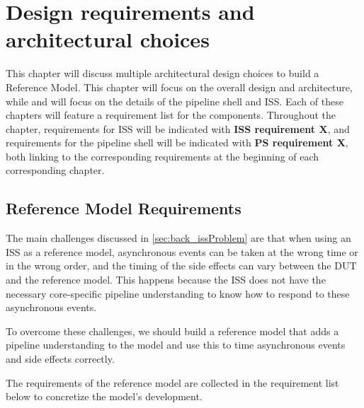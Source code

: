 \chapter{Design requirements and architectural choices}
\label{ch:design}

This chapter will discuss multiple architectural design choices to build a Reference Model. This chapter will focus on the overall design and architecture, while  and  will focus on the details of the pipeline shell and ISS. Each of these chapters will feature a requirement list for the components. Throughout the chapter, requirements for ISS will be indicated with \textbf{ISS requirement X}, and requirements for the pipeline shell will be indicated with \textbf{PS requirement X}, both linking to the corresponding requirements at the beginning of each corresponding chapter.

\section{Reference Model Requirements}
\label{sec:rm_req}

The main challenges discussed in \cref{sec:back_issProblem} are that when using an ISS as a reference model, asynchronous events can be taken at the wrong time or in the wrong order, and the timing of the side effects can vary between the DUT and the reference model. This happens because the ISS does not have the necessary core-specific pipeline understanding to know how to respond to these asynchronous events.

To overcome these challenges, we should build a reference model that adds a pipeline understanding to the model and use this to time asynchronous events and side effects correctly.





The requirements of the reference model are collected in the requirement list below to concretize the model's development.


